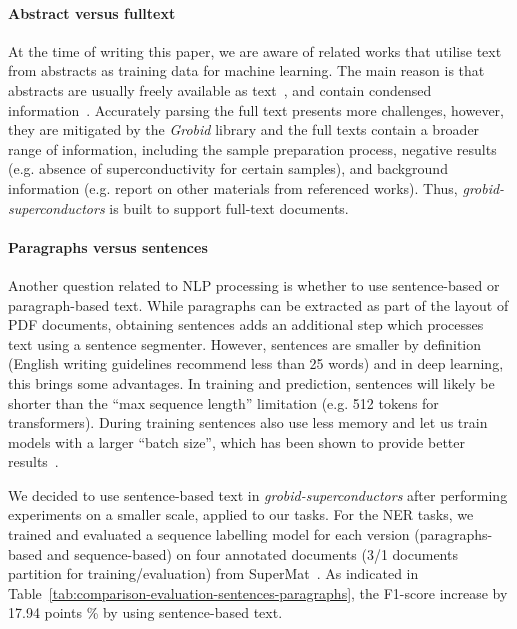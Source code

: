 \documentclass[]{interact}
\theoremstyle{plain}%
\theoremstyle{definition}
\theoremstyle{remark}
\begin{document}
\paragraph*{Abstract versus fulltext}
At the time of writing this paper, we are aware of related works that utilise text from abstracts as training data for machine learning.
The main reason is that abstracts are usually freely available as text~\cite{kononova_text-mined_2019}, and contain condensed information~\cite{yamaguchi-etal-2020-sc, court_magnetic_2020}.
Accurately parsing the full text presents more challenges, however, they are mitigated by the \textit{Grobid} library and the full texts contain a broader range of information, including the sample preparation process, negative results (e.g. absence of superconductivity for certain samples), and background information (e.g. report on other materials from referenced works).
Thus, \textit{grobid-superconductors} is built to support full-text documents.

\paragraph*{Paragraphs versus sentences}
Another question related to NLP processing is whether to use sentence-based or paragraph-based text.
While paragraphs can be extracted as part of the layout of PDF documents, obtaining sentences adds an additional step which processes text using a sentence segmenter.
However, sentences are smaller by definition (English writing guidelines recommend less than 25 words) and in deep learning, this brings some advantages.
In training and prediction, sentences will likely be shorter than the ``max sequence length'' limitation (e.g. 512 tokens for transformers).
During training sentences also use less memory and let us train models with a larger ``batch size'', which has been shown to provide better results~\cite{roberta}.

We decided to use sentence-based text in \textit{grobid-superconductors} after performing experiments on a smaller scale, applied to our tasks.
For the NER tasks, we trained and evaluated a sequence labelling model for each version (paragraphs-based and sequence-based) on four annotated documents (3/1 documents partition for training/evaluation) from SuperMat~\cite{foppiano2021supermat}.
As indicated in Table~\ref{tab:comparison-evaluation-sentences-paragraphs}, the F1-score increase by 17.94 points \% by using sentence-based text.
\end{document}

